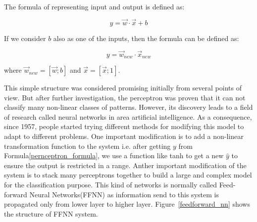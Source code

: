 \documentclass[officiallayout]{tktla}
\begin{document}
The formula of representing input and output is defined as:

\begin{equation}
y = \vec{w}\cdot\vec{x} + b
\end{equation}

If we consider $b$ also as one of the inputs, then the formula can be defined as:

\begin{equation}
y = \vec{w}_{new}\cdot\vec{x}_{new}
\end{equation}\label{pronceptron_formula}

where $ \vec{w}_{new} = [\vec{w};b] $ and $\vec{x} = [\vec{x};1]$.

This simple structure was considered promising initially from several points of view. But after further investigation, the perceptron was proven that it can not classify many non-linear classes of patterns. However, its discovery leads to a field of research called neural networks in area artificial intelligence. As a consequence, since 1957, people started trying different methods for modifying this model to adapt to different problems. One important modification is to add a non-linear transformation function to the system i.e. after getting $y$ from Formula\ref{pernceptron_formula}, we use a function like tanh to get a new $\hat{y}$ to ensure the output is restricted in a range. Anther important modification of the system is to stack many perceptrons together to build a large and complex model for the classification purpose. This kind of networks is normally called Feed-forward Neural Networks(FFNN) as information send to this system is propagated only from lower layer to higher layer. Figure~\ref{feedforward_nn} shows the structure of FFNN system.
\end{document}
